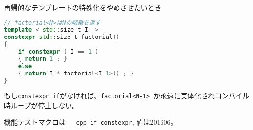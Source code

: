 再帰的なテンプレートの特殊化をやめさせたいとき
\begin{lstlisting}[language=C++]
// factorial<N>はNの階乗を返す
template < std::size_t I  >
constexpr std::size_t factorial()
{
    if constexpr ( I == 1 )
    { return 1 ; }
    else
    { return I * factorial<I-1>() ; }
}
\end{lstlisting}
もし\lstinline!constexpr if!がなければ、\lstinline!factorial<N-1>!~が永遠に実体化されコンパイル時ループが停止しない。

機能テストマクロは~\lstinline!__cpp_if_constexpr!, 値は201606。
